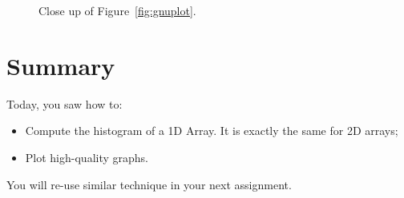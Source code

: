 \documentclass[english,a4paper,12pt,oneside]{article}
\begin{document}
\begin{figure}[!h]
\centering
\hfill
{}
\caption{\label{fig:zoom}Close up of Figure~\ref{fig:gnuplot}.}
\end{figure}

\section*{Summary}

Today, you saw how to:
\begin{itemize}
\item Compute the histogram of a 1D Array. It is exactly the same for 2D arrays;
\item Plot high-quality graphs.
\end{itemize}
You will re-use similar technique in your next assignment.

\end{document}
